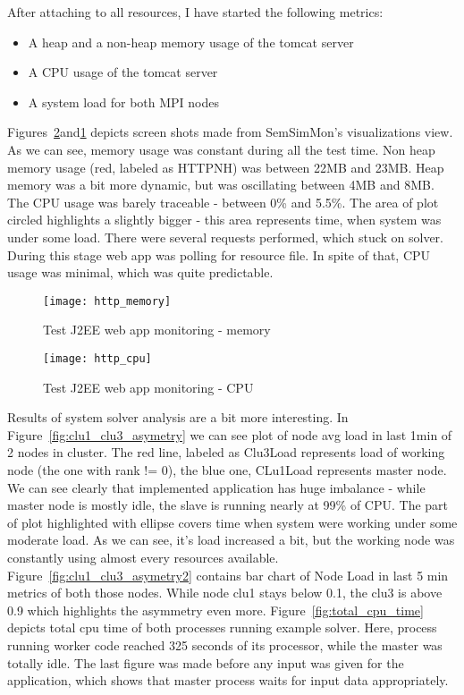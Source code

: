 After attaching to all resources, I have started the following metrics:

\begin{itemize}
\item A heap and a non-heap memory usage of the tomcat server
\item A CPU usage of the tomcat server
\item A system load for both MPI nodes
\end{itemize}

Figures~\ref{fig:http_cpu}and\ref{fig:http_memory} depicts screen shots made from SemSimMon\rq{}s visualizations view. As we can see, memory usage was constant during all the test time. Non heap memory usage (red, labeled as HTTPNH) was between 22MB and 23MB. Heap memory was a bit more dynamic, but was oscillating between 4MB and 8MB. The CPU usage was barely traceable - between 0\% and 5.5\%. The area of plot circled highlights a slightly bigger - this area represents time, when system was under some load. There were several requests performed, which stuck on solver. During this stage web app was polling for resource file. In spite of that, CPU usage was minimal, which was quite predictable. 

\begin{figure}[ht]
\centering
\texttt{[image: http\_memory]}
\caption{Test J2EE web app monitoring - memory}
\label{fig:http_memory}
\end{figure}

\begin{figure}[ht]
\centering
\texttt{[image: http\_cpu]}
\caption{Test J2EE web app monitoring - CPU}
\label{fig:http_cpu}
\end{figure}


Results of system solver analysis are a bit more interesting. In Figure~\ref{fig:clu1_clu3_asymetry} we can see plot of node avg load in last 1min of 2 nodes in cluster. The red line, labeled as Clu3Load represents load of working node (the one with rank != 0), the blue one, CLu1Load represents master node. We can see clearly that implemented application has huge imbalance - while master node is mostly idle, the slave is running nearly at 99\% of CPU. The part of plot highlighted with ellipse covers time when system were working under some moderate load. As we can see, it\rq{}s load increased a bit, but the working node was constantly using almost every resources available. Figure~\ref{fig:clu1_clu3_asymetry2} contains bar chart of Node Load in last 5 min metrics of both those nodes. While node clu1 stays below 0.1, the clu3 is above 0.9 which highlights the asymmetry even more. Figure~\ref{fig:total_cpu_time} depicts total cpu time of both processes running example solver. Here, process running worker code reached 325 seconds of its processor, while the master was totally idle. The last figure was made before any input was given for the application, which shows that master process waits for input data appropriately.

